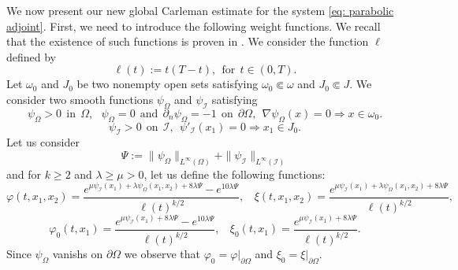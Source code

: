 \documentclass[a4paper, 12pt]{article}
\theoremstyle{plain}
\theoremstyle{definition}
\numberwithin{theorem}{section}
\numberwithin{equation}{section}
\begin{document}
We now present our new global Carleman estimate for the system \eqref{eq: parabolic adjoint}.
First, we need to introduce the following weight functions. We recall that the existence of such functions is proven in \cite[Section 2.2]{Buffe}. We consider the function $\ell$ defined by
$$\ell(t):=t(T-t),~~\text{for}~~t\in (0,T).$$ 
Let $\omega_0$ and $J_0$ be two nonempty open sets satisfying $\omega_0\Subset\omega$ and $J_0\Subset J.$
We consider two smooth functions $\psi_\Omega$ and $\psi_{\mathcal{I}}$ satisfying 
\begin{equation}\label{w1}
\psi_{\Omega}>0~~\text{in}~~\Omega,~~~\psi_\Omega=0~~\text{and}~~\partial_n\psi_{\Omega}=-1~~\text{on}~~\partial\Omega,~~\nabla\psi_\Omega(x)=0\Rightarrow x\in\omega_0.
\end{equation}
\begin{equation}\label{w2}
\psi_{\mathcal{I}}>0~~\text{on}~~\mathcal{I},~~\psi'_{\mathcal{I}}(x_1)=0\Rightarrow x_1\in J_0.
\end{equation}
Let us consider 
\begin{equation} \label{eq_def_PSI} 
\Psi:=\|\psi_\Omega\|_{L^{\infty}(\Omega)}+\|\psi_{\mathcal{I}}\|_{L^{\infty}(\mathcal{I})}\end{equation}
and for $k\geq 2$ and $\lambda\geq \mu>0$, let us define the following functions:
\begin{equation}\label{weights2}
\varphi(t,x_1,x_2)=\frac{e^{\mu\psi_{\mathcal{I}}(x_1)+\lambda\psi_\Omega(x_1,x_2)+8\lambda\Psi}-e^{10\lambda\Psi}}{\ell(t)^{k/2}},~~~~\xi(t,x_1,x_2)=\frac{e^{\mu\psi_{\mathcal{I}}(x_1)+\lambda\psi_\Omega(x_1,x_2)+8\lambda\Psi}}{\ell(t)^{k/2}},
\end{equation}
\begin{equation}\label{weights1}
 \varphi_0(t,x_1)=\frac{e^{\mu\psi_{\mathcal{I}}(x_1)+8\lambda\Psi}-e^{10\lambda\Psi}}{\ell(t)^{k/2}},~~~~\xi_0(t,x_1)=\frac{e^{\mu\psi_{\mathcal{I}}(x_1)+8\lambda\Psi}}{\ell(t)^{k/2}}.
\end{equation}
Since $\psi_\Omega$ vanishs on $\partial\Omega$ we observe that $\varphi_0=\varphi|_{\partial\Omega}$  and $\xi_0=\xi|_{\partial\Omega}$.

\end{document}
